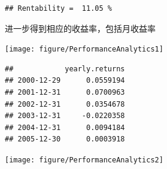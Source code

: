 \documentclass{article}\usepackage[]{graphicx}\usepackage[]{color}
\makeatletter
\newenvironment{kframe}{%
 \def\at@end@of@kframe{}%
 \ifinner\ifhmode%
  \def\at@end@of@kframe{\end{minipage}}%
  \begin{minipage}{\columnwidth}%
 \fi\fi%
 \def\FrameCommand##1{\hskip\@totalleftmargin \hskip-\fboxsep
 \colorbox{shadecolor}{##1}\hskip-\fboxsep
     \hskip-\linewidth \hskip-\@totalleftmargin \hskip\columnwidth}%
 \MakeFramed {\advance\hsize-\width
   \@totalleftmargin\z@ \linewidth\hsize
   \@setminipage}}%
 {\par\unskip\endMakeFramed%
 \at@end@of@kframe}
\newenvironment{knitrout}{}{} %
\makeatother
\begin{document}
\begin{CJK*}{UTF8}{gkai}
\begin{knitrout}
{}


\begin{kframe}\begin{verbatim}
## Rentability =  11.05 %
\end{verbatim}
\end{kframe}
\end{knitrout}

进一步得到相应的收益率，包括月收益率
\begin{knitrout}
\color{fgcolor}

{\centering \texttt{[image: figure/PerformanceAnalytics1]} 

}


\begin{kframe}\begin{verbatim}
##            yearly.returns
## 2000-12-29      0.0559194
## 2001-12-31      0.0700963
## 2002-12-31      0.0354678
## 2003-12-31     -0.0220358
## 2004-12-31      0.0094184
## 2005-12-30      0.0003918
\end{verbatim}
\end{kframe}

{\centering \texttt{[image: figure/PerformanceAnalytics2]} 

}




\end{knitrout}
\end{CJK*}
\end{document}
